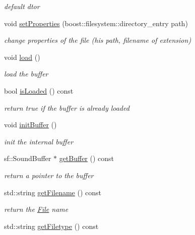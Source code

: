 \begin{DoxyCompactItemize}
\begin{DoxyCompactList}\small\item\em default dtor \end{DoxyCompactList}\item 
void \hyperlink{classFile_adba1bb8e873727a0fce531bbd5f79a05}{set\+Properties} (boost\+::filesystem\+::directory\+\_\+entry path)
\begin{DoxyCompactList}\small\item\em change properties of the file (his path, filename of extension) \end{DoxyCompactList}\item 
void \hyperlink{classFile_a768a2c7f79d26eed019aec81523a4eef}{load} ()
\begin{DoxyCompactList}\small\item\em load the buffer \end{DoxyCompactList}\item 
bool \hyperlink{classFile_ace611438e36854bf5c971bd5f12f8ae9}{is\+Loaded} () const 
\begin{DoxyCompactList}\small\item\em return true if the buffer is already loaded \end{DoxyCompactList}\item 
void \hyperlink{classFile_a0f78315c4a520d293695433242f64649}{init\+Buffer} ()
\begin{DoxyCompactList}\small\item\em init the internal buffer \end{DoxyCompactList}\item 
sf\+::\+Sound\+Buffer $\ast$ \hyperlink{classFile_a949e0c451659a270b8f1a8ea9cb7d160}{get\+Buffer} () const \hypertarget{classFile_a949e0c451659a270b8f1a8ea9cb7d160}{}\label{classFile_a949e0c451659a270b8f1a8ea9cb7d160}

\begin{DoxyCompactList}\small\item\em return a pointer to the buffer \end{DoxyCompactList}\item 
std\+::string \hyperlink{classFile_a3a50279188dd9234358cfef31fc8d56a}{get\+Filename} () const \hypertarget{classFile_a3a50279188dd9234358cfef31fc8d56a}{}\label{classFile_a3a50279188dd9234358cfef31fc8d56a}

\begin{DoxyCompactList}\small\item\em return the \hyperlink{classFile}{File} name \end{DoxyCompactList}\item 
std\+::string \hyperlink{classFile_af383016d3e5cd1eb78d8c33dfa0e3503}{get\+Filetype} () const \hypertarget{classFile_af383016d3e5cd1eb78d8c33dfa0e3503}{}\label{classFile_af383016d3e5cd1eb78d8c33dfa0e3503}


\end{DoxyCompactItemize}
